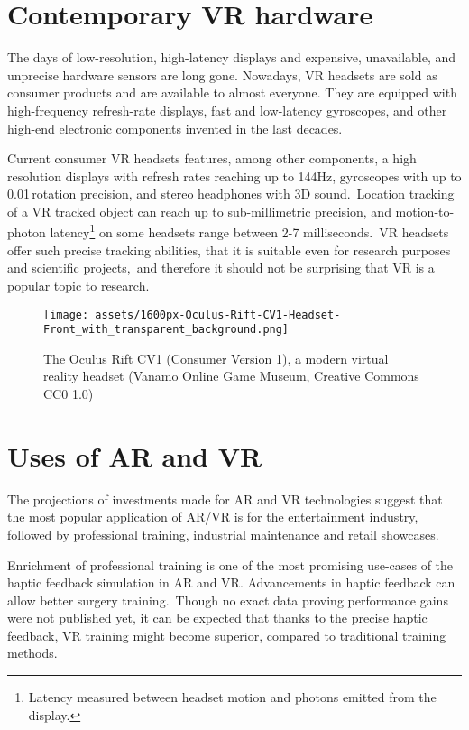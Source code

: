 \section{Contemporary VR hardware}
The days of low-resolution, high-latency displays and expensive, unavailable,
and unprecise hardware sensors are long gone. Nowadays, VR headsets are
sold as consumer products and are available to almost everyone. They are
equipped with high-frequency refresh-rate displays, fast and low-latency
gyroscopes, and other high-end electronic components invented in the last
decades.

Current consumer VR headsets features, among other components,
a high resolution displays with refresh rates reaching up to 144Hz,
\cite{vlvindx} gyroscopes with up to 0.01\degree\,rotation precision, 
and stereo headphones with 3D sound.\,\cite{vivenasa}
Location tracking of a VR tracked object can reach up to sub-millimetric precision, 
and motion-to-photon latency\footnote{Latency measured between headset motion and photons emitted from the display.}
on some headsets range between 2-7 milliseconds.\,\cite{mtpltc}\cite{xinwiki}
VR headsets offer such precise tracking abilities, that it is suitable even
for research purposes and scientific projects,\,\cite{vivepbsr} and therefore
it should not be surprising that VR is a popular topic to research.


\begin{figure}[h]{}
\centering\texttt{[image: assets/1600px-Oculus-Rift-CV1-Headset-Front\_with\_transparent\_background.png]}
\caption{The Oculus Rift CV1 (Consumer Version 1), a modern virtual reality headset 
    (Vanamo Online Game Museum, Creative Commons CC0 1.0)}
\end{figure}

\section{Uses of AR and VR}
The projections of investments made for AR and VR technologies suggest
that the most popular application of AR/VR is for the entertainment industry,
followed by professional training, industrial maintenance and retail showcases.
\cite{statistavr}

Enrichment of professional training is one of the most promising use-cases
of the haptic feedback simulation in AR and VR.
Advancements in haptic feedback can allow better surgery training.\,\cite{vhfcrmisvrt}
Though no exact data proving performance gains
were not published yet, it can be expected that thanks to the precise haptic
feedback, VR training might become superior, compared to traditional
training methods.\,\cite{vrsrgr}

